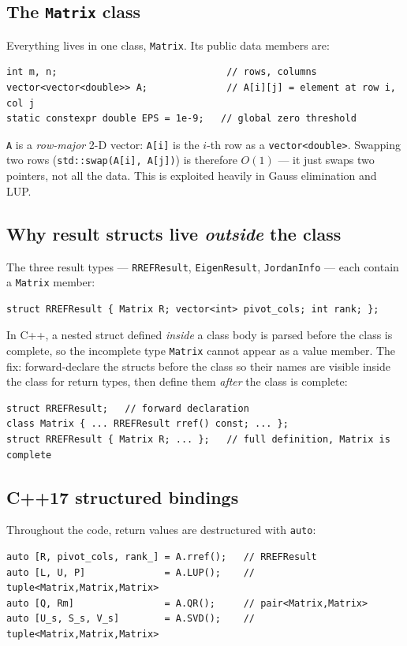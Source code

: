 \documentclass[12pt, a4paper]{article}
\newcommand{\code}[1]{\texttt{\small#1}}
\begin{document}
\subsection{The \texttt{Matrix} class}

Everything lives in one class, \code{Matrix}.  Its public data members are:
\begin{lstlisting}
int m, n;                              // rows, columns
vector<vector<double>> A;              // A[i][j] = element at row i, col j
static constexpr double EPS = 1e-9;   // global zero threshold
\end{lstlisting}

\code{A} is a \emph{row-major} 2-D vector: \code{A[i]} is the $i$-th row as a
\code{vector<double>}.  Swapping two rows (\code{std::swap(A[i], A[j])}) is
therefore $O(1)$ — it just swaps two pointers, not all the data.  This is
exploited heavily in Gauss elimination and LUP.

\subsection{Why result structs live \emph{outside} the class}

The three result types — \code{RREFResult}, \code{EigenResult},
\code{JordanInfo} — each contain a \code{Matrix} member:

\begin{lstlisting}
struct RREFResult { Matrix R; vector<int> pivot_cols; int rank; };
\end{lstlisting}

In C++, a nested struct defined \emph{inside} a class body is parsed before
the class is complete, so the incomplete type \code{Matrix} cannot appear as a
value member.  The fix: forward-declare the structs before the class so their
names are visible inside the class for return types, then define them
\emph{after} the class is complete:

\begin{lstlisting}
struct RREFResult;   // forward declaration
class Matrix { ... RREFResult rref() const; ... };
struct RREFResult { Matrix R; ... };   // full definition, Matrix is complete
\end{lstlisting}

\subsection{C++17 structured bindings}

Throughout the code, return values are destructured with \code{auto}:
\begin{lstlisting}
auto [R, pivot_cols, rank_] = A.rref();   // RREFResult
auto [L, U, P]              = A.LUP();    // tuple<Matrix,Matrix,Matrix>
auto [Q, Rm]                = A.QR();     // pair<Matrix,Matrix>
auto [U_s, S_s, V_s]        = A.SVD();    // tuple<Matrix,Matrix,Matrix>
\end{lstlisting}
\end{document}
